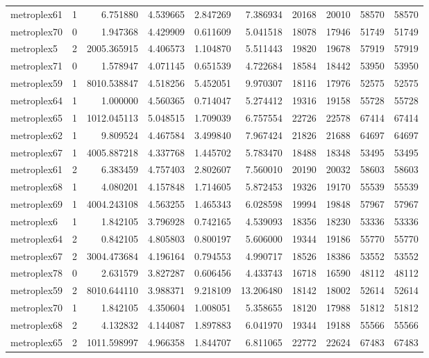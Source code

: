 \begin{longtable}{|l|r|r|r|r|r|r|r|r|r|}
metroplex61 & 1 & 6.751880 & 4.539665 & 2.847269 & 7.386934 & 20168 & 20010 & 58570 & 58570 \\
metroplex70 & 0 & 1.947368 & 4.429909 & 0.611609 & 5.041518 & 18078 & 17946 & 51749 & 51749 \\
metroplex5 & 2 & 2005.365915 & 4.406573 & 1.104870 & 5.511443 & 19820 & 19678 & 57919 & 57919 \\
metroplex71 & 0 & 1.578947 & 4.071145 & 0.651539 & 4.722684 & 18584 & 18442 & 53950 & 53950 \\
metroplex59 & 1 & 8010.538847 & 4.518256 & 5.452051 & 9.970307 & 18116 & 17976 & 52575 & 52575 \\
metroplex64 & 1 & 1.000000 & 4.560365 & 0.714047 & 5.274412 & 19316 & 19158 & 55728 & 55728 \\
metroplex65 & 1 & 1012.045113 & 5.048515 & 1.709039 & 6.757554 & 22726 & 22578 & 67414 & 67414 \\
metroplex62 & 1 & 9.809524 & 4.467584 & 3.499840 & 7.967424 & 21826 & 21688 & 64697 & 64697 \\
metroplex67 & 1 & 4005.887218 & 4.337768 & 1.445702 & 5.783470 & 18488 & 18348 & 53495 & 53495 \\
metroplex61 & 2 & 6.383459 & 4.757403 & 2.802607 & 7.560010 & 20190 & 20032 & 58603 & 58603 \\
metroplex68 & 1 & 4.080201 & 4.157848 & 1.714605 & 5.872453 & 19326 & 19170 & 55539 & 55539 \\
metroplex69 & 1 & 4004.243108 & 4.563255 & 1.465343 & 6.028598 & 19994 & 19848 & 57967 & 57967 \\
metroplex6 & 1 & 1.842105 & 3.796928 & 0.742165 & 4.539093 & 18356 & 18230 & 53336 & 53336 \\
metroplex64 & 2 & 0.842105 & 4.805803 & 0.800197 & 5.606000 & 19344 & 19186 & 55770 & 55770 \\
metroplex67 & 2 & 3004.473684 & 4.196164 & 0.794553 & 4.990717 & 18526 & 18386 & 53552 & 53552 \\
metroplex78 & 0 & 2.631579 & 3.827287 & 0.606456 & 4.433743 & 16718 & 16590 & 48112 & 48112 \\
metroplex59 & 2 & 8010.644110 & 3.988371 & 9.218109 & 13.206480 & 18142 & 18002 & 52614 & 52614 \\
metroplex70 & 1 & 1.842105 & 4.350604 & 1.008051 & 5.358655 & 18120 & 17988 & 51812 & 51812 \\
metroplex68 & 2 & 4.132832 & 4.144087 & 1.897883 & 6.041970 & 19344 & 19188 & 55566 & 55566 \\
metroplex65 & 2 & 1011.598997 & 4.966358 & 1.844707 & 6.811065 & 22772 & 22624 & 67483 & 67483 \\

\end{longtable}
